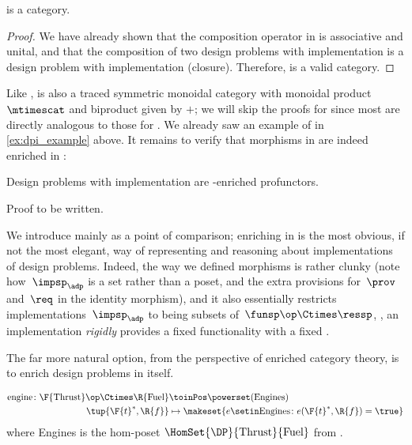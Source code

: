 {    \begin{lemma}
        \DPI is a category.
    \end{lemma}

    \begin{proof}
        We have already shown that the composition operator in \DPI is associative and unital, and that the composition of two design problems with implementation is a design problem with implementation (closure).
        Therefore, \DPI is a valid category.
    \end{proof}

    Like \DP, \DPI is also a traced symmetric monoidal category with monoidal product $\mtimescat$ and biproduct given by $+$;
    we will skip the proofs for \DPI since most are directly analogous to those for \DP.
    We already saw an example of \DPI in \cref{ex:dpi_example} above.
    It remains to verify that morphisms in \DPI are indeed enriched in \Set:

    \begin{proposition}
        Design problems with implementation are \Set-enriched profunctors.
    \end{proposition}
    \begin{publictodo}
        Proof to be written.
    \end{publictodo}
    We introduce \DPI mainly as a point of comparison; enriching in \Set is the most obvious, if not the most elegant, way of representing and reasoning about implementations of design problems.
    Indeed, the way we defined morphisms is rather clunky (note how~$\impsp_\adp$ is a set rather than a poset, and the extra provisions for~$\prov$ and~$\req$ in the identity morphism), and it also essentially restricts implementations~$\impsp_\adp$ to being subsets of~$\funsp\op \Ctimes \ressp$, \ie, an implementation \emph{rigidly} provides a fixed functionality \fun with a fixed \res.

    The far more natural option, from the perspective of enriched category theory, is to enrich design problems in \DP itself.

    \begin{example}
        \begin{equation}
            \begin{aligned}
                \text{engine} \colon \F{\text{Thrust}}\op \Ctimes \R{\text{Fuel}} & \toinPos \powerset(\text{Engines}) \\
                \tup{\F{t}^*,\R{f}}                                               & \mapsto \makeset{ e \setin \text{Engines} \colon e(\F{t}^*, \R{f}) = \true }
            \end{aligned}
        \end{equation}
        where Engines is the hom-poset $\HomSet{\DP}{\text{Thrust}}{\text{Fuel}}$ from \XXX. %
    \end{example}

}
